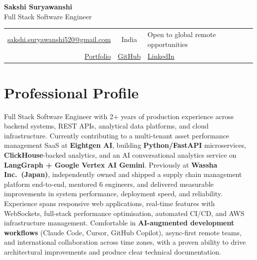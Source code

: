 \documentclass[a4paper,11.5pt]{article}
\begin{document}
\begin{center}
  {\huge\textbf{Sakshi Suryawanshi}}\\[0.28em]
  {\large Full Stack Software Engineer}\\[0.45em]
  \begin{tabular}{r@{\enspace\textbar\enspace}c@{\enspace\textbar\enspace}l}
    \href{mailto:sakshi.suryawanshi520@gmail.com}{sakshi.suryawanshi520@gmail.com}
      & India
      & Open to global remote opportunities \\[0.15em]
    \href{https://sakshi-suryawanshi.vercel.app/}{Portfolio}
      & \href{https://github.com/sakshi-suryawanshi}{GitHub}
      & \href{https://www.linkedin.com/in/sakshi-suryawanshi-21b11819b/}{LinkedIn}
  \end{tabular}
\end{center}

\vspace{0.4em}

\section*{Professional Profile}
Full Stack Software Engineer with 2+ years of production experience across backend systems, REST APIs, analytical data platforms, and cloud infrastructure. Currently contributing to a multi-tenant asset performance management SaaS at \textbf{Eightgen AI}, building \textbf{Python/FastAPI} microservices, \textbf{ClickHouse}-backed analytics, and an AI conversational analytics service on \textbf{LangGraph + Google Vertex AI Gemini}. Previously at \textbf{Wassha Inc.\ (Japan)}, independently owned and shipped a supply chain management platform end-to-end, mentored 6 engineers, and delivered measurable improvements in system performance, deployment speed, and reliability. Experience spans responsive web applications, real-time features with WebSockets, full-stack performance optimisation, automated CI/CD, and AWS infrastructure management. Comfortable in \textbf{AI-augmented development workflows} (Claude Code, Cursor, GitHub Copilot), async-first remote teams, and international collaboration across time zones, with a proven ability to drive architectural improvements and produce clear technical documentation.

\vspace{0.4em}
\end{document}
